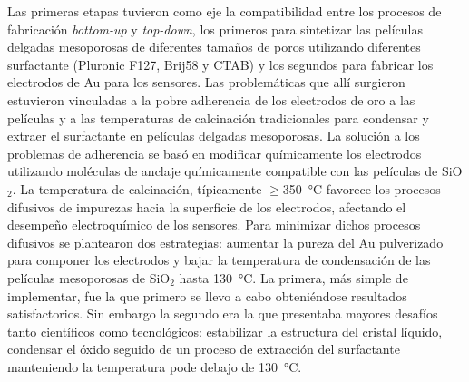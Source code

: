 Las primeras etapas tuvieron como eje la compatibilidad entre los procesos de fabricación \textit{bottom-up} y \textit{top-down}, los primeros para sintetizar las películas delgadas mesoporosas de diferentes tamaños de poros utilizando diferentes surfactante (Pluronic F127, Brij58 y CTAB) y los segundos para fabricar los electrodos de Au  para los sensores. Las problemáticas que allí surgieron estuvieron vinculadas a la pobre adherencia de los electrodos de oro a las películas y a las temperaturas de calcinación tradicionales para condensar y extraer el surfactante en películas delgadas mesoporosas. La solución a los problemas de adherencia se basó en modificar químicamente los electrodos utilizando moléculas de anclaje químicamente compatible con las películas de SiO$_2$.  La temperatura de calcinación, típicamente $\geq$\SI{350}{\celsius} favorece los procesos difusivos de impurezas hacia la superficie de los electrodos, afectando el desempeño electroquímico de los sensores. Para minimizar dichos procesos difusivos se plantearon dos estrategias: aumentar la pureza del Au  pulverizado para componer los electrodos y bajar la temperatura de condensación de las películas mesoporosas de SiO$_2$ hasta \SI{130}{\celsius}. La primera, más simple de implementar, fue la que primero se llevo a cabo obteniéndose resultados satisfactorios. Sin embargo la segundo era la que presentaba mayores desafíos tanto científicos como tecnológicos: estabilizar la estructura del cristal líquido, condensar el óxido seguido de un proceso de extracción del surfactante manteniendo la temperatura pode debajo de \SI{130}{\celsius}. 

